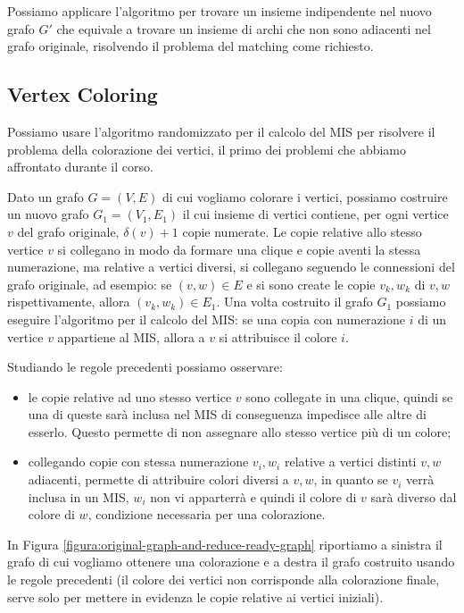 \documentclass{article}
\begin{document}
Possiamo applicare l'algoritmo per trovare un insieme indipendente nel nuovo
grafo $G'$ che equivale a trovare un insieme di archi che non sono adiacenti nel
grafo originale, risolvendo il problema del matching come richiesto.

\subsection{Vertex Coloring}
Possiamo usare l'algoritmo randomizzato per il calcolo del MIS per risolvere
il problema della colorazione dei vertici, il primo dei problemi che 
abbiamo affrontato durante il corso. 

Dato un grafo $G = (V, E)$ di cui
vogliamo colorare i vertici, possiamo costruire un nuovo grafo 
$G_1 = (V_1, E_1)$
il cui insieme di vertici contiene, per ogni vertice $v$ del grafo
originale, $\delta(v) + 1$ copie numerate. 
Le copie relative allo stesso 
vertice $v$ si collegano in modo da formare una clique e
copie aventi la stessa numerazione, ma relative a vertici diversi, si
collegano seguendo le
connessioni del grafo originale, ad esempio: se $(v,w) \in E$ e si 
sono create le copie $v_k,w_k$ di $v,w$ rispettivamente, 
allora $(v_k,w_k) \in E_1$. 
Una volta costruito il grafo $G_1$ possiamo eseguire l'algoritmo per
il calcolo del MIS: se una copia con numerazione $i$ di un vertice $v$
appartiene al MIS, allora a $v$ si attribuisce il colore $i$.

Studiando le regole precedenti possiamo osservare:
\begin{itemize}
    \item   le copie relative ad uno stesso vertice $v$ sono collegate
            in una clique, quindi se una di queste sar\`a inclusa nel MIS
            di conseguenza impedisce alle altre di esserlo. Questo
            permette di non assegnare allo stesso vertice pi\`u di 
            un colore;
    \item   collegando copie con stessa numerazione $v_i, w_i$ 
            relative a vertici distinti $v,w$ adiacenti,
            permette di attribuire colori diversi a $v,w$, 
            in quanto se $v_i$ verr\`a inclusa in un MIS,
            $w_i$ non vi apparterr\`a e quindi il colore di $v$ sar\`a 
            diverso dal colore di $w$, condizione necessaria per una 
            colorazione.
\end{itemize}

In Figura 
\ref{figura:original-graph-and-reduce-ready-graph} riportiamo a sinistra
il grafo di cui vogliamo ottenere una colorazione e a destra il grafo
costruito usando le regole precedenti (il colore dei vertici non corrisponde
alla colorazione finale, serve solo per mettere in evidenza le copie
relative ai vertici iniziali).
\end{document}
